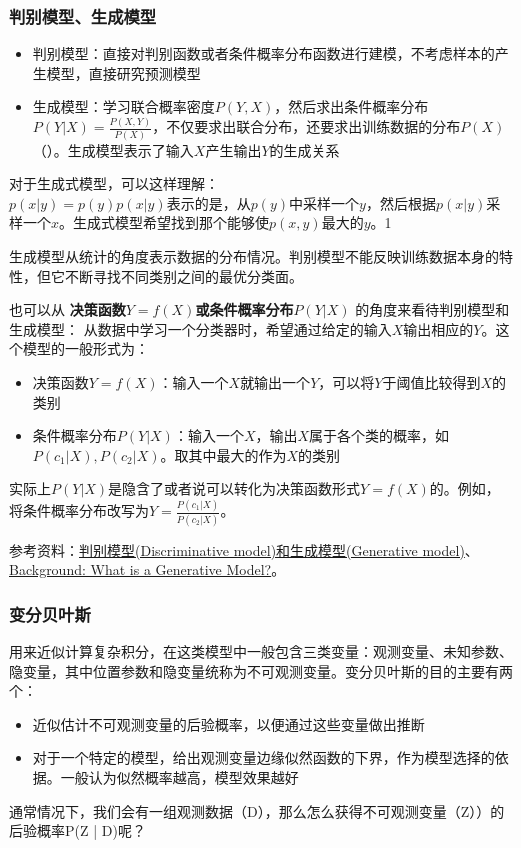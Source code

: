 \subsubsection{判别模型、生成模型}
\begin{itemize}
	\item 判别模型：直接对判别函数或者条件概率分布函数进行建模，不考虑样本的产生模型，直接研究预测模型
	\item 生成模型：学习联合概率密度$P(Y, X)$，然后求出条件概率分布$P(Y|X) = \frac{P(X, Y)}{P(X)}$，不仅要求出联合分布，还要求出训练数据的分布$P(X)$（{\color{red}{不一定要计算$p(X)$，因为对于同一个样本，计算它属于不同分类时，其$p(X)$是一样的，对判别没有帮助}}）。生成模型表示了输入$X$产生输出$Y$的生成关系
\end{itemize}

对于生成式模型，可以这样理解：\\
$p(x | y) = p(y)p(x | y)$表示的是，从$p(y)$中采样一个$y$，然后根据$p(x|y)$采样一个$x$。生成式模型希望找到那个能够使$p(x, y)$最大的$y$。1


生成模型从统计的角度表示数据的分布情况。判别模型不能反映训练数据本身的特性，但它不断寻找不同类别之间的最优分类面。

也可以从 \textbf{决策函数$Y=f(X)$或条件概率分布$P(Y|X)$} 的角度来看待判别模型和生成模型：
从数据中学习一个分类器时，希望通过给定的输入$X$输出相应的$Y$。这个模型的一般形式为：
\begin{itemize}
	\item 决策函数$Y=f(X)$：输入一个$X$就输出一个$Y$，可以将$Y$于阈值比较得到$X$的类别
	\item 条件概率分布$P(Y|X)$：输入一个$X$，输出$X$属于各个类的概率，如$P(c_1 | X), P(c_2 | X)$。取其中最大的作为$X$的类别
\end{itemize}
实际上$P(Y|X)$是隐含了或者说可以转化为决策函数形式$Y=f(X)$的。例如，将条件概率分布改写为$Y = \frac{P(c_1 | X)}{P(c_2 | X) }$。

参考资料：\href{https://blog.csdn.net/fishmemory/article/details/51711114}{判别模型(Discriminative model)和生成模型(Generative model)}、\href{https://developers.google.cn/machine-learning/gan/generative?hl=zh-cn}{Background: What is a Generative Model?}。

\subsubsection{变分贝叶斯}
用来近似计算复杂积分，在这类模型中一般包含三类变量：观测变量、未知参数、隐变量，其中位置参数和隐变量统称为不可观测变量。变分贝叶斯的目的主要有两个：
\begin{itemize}
	\item 近似估计不可观测变量的后验概率，以便通过这些变量做出推断
	\item 对于一个特定的模型，给出观测变量边缘似然函数的下界，作为模型选择的依据。一般认为似然概率越高，模型效果越好
\end{itemize}
通常情况下，我们会有一组观测数据（D），那么怎么获得不可观测变量（Z））的后验概率P(Z | D)呢？

